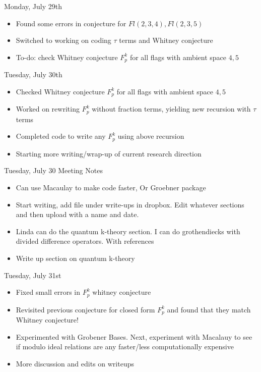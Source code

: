 Monday, July 29th
\begin{itemize}
    \item Found some errors in conjecture for $Fl(2, 3, 4), Fl(2, 3, 5)$
    \item Switched to working on coding $\tau$ terms and Whitney conjecture
    \item To-do: check Whitney conjecture $F_p^k$ for all flags with ambient space $4, 5$
\end{itemize}

Tuesday, July 30th
\begin{itemize}
    \item Checked Whitney conjecture $F_p^k$ for all flags with ambient space $4, 5$
    \item Worked on rewriting $F_p^k$ without fraction terms, yielding new recursion with $\tau$ terms
    \item Completed code to write any $F_p^k$ using above recursion
    \item Starting more writing/wrap-up of current research direction
\end{itemize}

Tuesday, July 30 Meeting Notes
\begin{itemize}
    \item Can use Macaulay to make code faster, Or Groebner package
    \item Start writing, add file under write-ups in dropbox. Edit whatever sections and then upload with a name and date. 
    \item Linda can do the quantum k-theory section. I can do grothendiecks with divided difference operators. With references
    \item Write up section on quantum k-theory 
\end{itemize}

Tuesday, July 31st
\begin{itemize}
    \item Fixed small errors in $F_p^k$ whitney conjecture
    \item Revisited previous conjecture for closed form $F_p^k$ and found that they match Whitney conjecture!
    \item Experimented with Grobener Bases. Next, experiment with Macalauy to see if modulo ideal relations are any faster/less computationally expensive
    \item More discussion and edits on writeups
\end{itemize}

